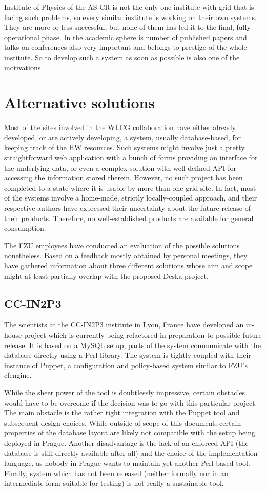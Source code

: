 \documentclass[12pt]{article}
\begin{document}
Institute of Physics of the AS CR is not the only one institute with grid that is facing such problems, so every similar institute
is working on their own systems. They are more or less successful, but none of them has led it to the final, fully operational phase.
In the academic sphere is number of published papers and talks on conferences also very important and belongs to prestige of
the whole institute. So to develop such a system as soon as possible is also one of the motivations.

\section{Alternative solutions}
Most of the sites involved in the WLCG collaboration have either already developed, or are actively developing, a system, usually
database-based, for keeping track of the HW resources.  Such systems might involve just a pretty straightforward web application
with a bunch of forms providing an interface for the underlying data, or even a complex solution with well-defined API for
accessing the information stored therein.  However, no such project has been completed to a state where it is usable by more than
one grid site.  In fact, most of the systems involve a home-made, strictly locally-coupled approach, and their respective authors
have expressed their uncertainty about the future release of their products.  Therefore, no well-established products are
available for general consumption.

The FZU employees have conducted an evaluation of the possible solutions nonetheless.  Based on a feedback mostly obtained by
personal meetings, they have gathered information about three different solutions whose aim and scope might at least partially
overlap with the proposed Deska project.

\subsection{CC-IN2P3}
The scientists at the CC-IN2P3 institute in Lyon, France have developed an in-house project which is currently being refactored in
preparation to possible future release.  It is based on a MySQL setup, parts of the system communicate with the database directly
using a Perl library.  The system is tightly coupled with their instance of Puppet, a configuration and policy-based system
similar to FZU's cfengine.

While the sheer power of the tool is doubtlessly impressive, certain obstacles would have to be overcome if the decision was to go
with this particular project.  The main obstacle is the rather tight integration with the Puppet tool and subsequent design
choices.  While outside of scope of this document, certain properties of the database layout are likely not compatible with the
setup being deployed in Prague.  Another disadvantage is the lack of an enforced API (the database is still directly-available
after all) and the choice of the implementation language, as nobody in Prague wants to maintain yet another Perl-based tool.
Finally, system which has not been released (neither formally nor in an intermediate form suitable for testing) is not really a
sustainable tool.
\end{document}
